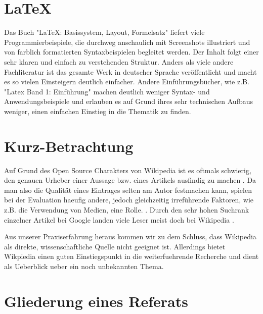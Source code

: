 \documentclass{lib/wa}
\begin{document}
\section{LaTeX}

  Das Buch "LaTeX: Basissystem, Layout, Formelsatz" \cite{braune2006} liefert viele Programmierbeispiele, die durchweg anschaulich mit Screenshots illustriert und von farblich formatierten Syntaxbeispielen begleitet werden. Der Inhalt folgt einer sehr klaren und einfach zu verstehenden Struktur. Anders als viele andere Fachliteratur ist das gesamte Werk in deutscher Sprache veröffentlicht und macht es so vielen Einsteigern deutlich einfacher. Andere Einführungsbücher, wie z.B. "Latex Band 1: Einführung" machen deutlich weniger Syntax- und Anwendungsbeispiele und erlauben es auf Grund ihres sehr technischen Aufbaus weniger, einen einfachen Einstieg in die Thematik zu finden.
  \newline


\section{Kurz-Betrachtung}

  Auf Grund des Open Source Charakters von Wikipedia ist es oftmals schwierig, den genauen Urheber einer Aussage bzw. eines Artikels ausfindig zu machen \cite{waters2007}.
  Da man also die Qualität eines Eintrages selten am Autor festmachen kann, spielen bei der Evaluation haeufig andere, jedoch gleichzeitig irreführende Faktoren, wie z.B. die Verwendung von Medien, eine Rolle. \cite{lucassen2010}.
  Durch den sehr hohen Suchrank einzelner Artikel bei Google landen viele Leser meist doch bei Wikipedia \cite{waters2007}.

  Aus unserer Praxiserfahrung heraus kommen wir zu dem Schluss, dass Wikipedia als direkte, wissenschaftliche Quelle nicht geeignet ist. Allerdings bietet Wikpiedia einen guten Einstiegspunkt in die weiterfuehrende Recherche und dient als Ueberblick ueber ein noch unbekannten Thema.
  \newline


\section{Gliederung eines Referats}
\end{document}
